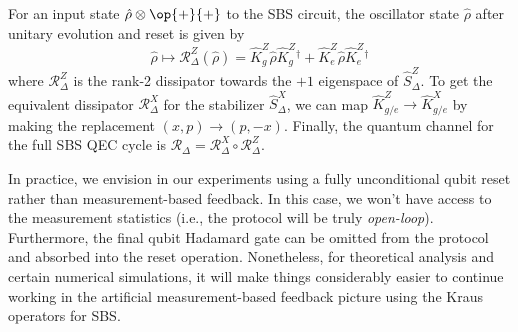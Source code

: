 For an input state $\hat{\rho}\otimes \op{+}{+}$ to the SBS circuit, the oscillator state $\hat{\rho}$ after unitary evolution and reset is given by
\begin{equation}
    \hat{\rho} \mapsto \mathcal{R}_\Delta^Z(\hat{\rho}) = \hat{K}_g^Z \hat{\rho} \hat{K}_g^Z{}^\dagger + \hat{K}_e^Z \hat{\rho} \hat{K}_e^Z{}^\dagger  
\end{equation}
where $\mathcal{R}_\Delta^Z$ is the rank-2 dissipator towards the $+1$ eigenspace of $\hat{S}_\Delta^Z$. To get the equivalent dissipator $\mathcal{R}_\Delta^X$ for the stabilizer $\hat{S}_\Delta^X$, we can map $\hat{K}_{g/e}^Z \to \hat{K}_{g/e}^X$ by making the replacement $(x, p) \to (p, -x)$. Finally, the quantum channel for the full SBS QEC cycle is $\mathcal{R}_\Delta = \mathcal{R}_\Delta^X \circ \mathcal{R}_\Delta^Z$. 

In practice, we envision in our experiments using a fully unconditional qubit reset rather than measurement-based feedback. In this case, we won't have access to the measurement statistics (i.e., the protocol will be truly \textit{open-loop}). Furthermore, the final qubit Hadamard gate can be omitted from the protocol and absorbed into the reset operation. Nonetheless, for theoretical analysis and certain numerical simulations, it will make things considerably easier to continue working in the artificial measurement-based feedback picture using the Kraus operators for SBS.

